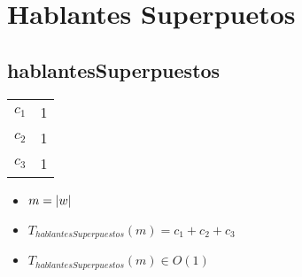 \documentclass{article}
\begin{document}
    \section*{Hablantes Superpuetos}

    \subsection*{hablantesSuperpuestos}

    \begin{minipage}{0.70\textwidth}
        
    \end{minipage}
    \hfill
    \begin{minipage}{0.25\textwidth}
        \begin{tabular}{|c|c}
            $c_1$ & 1 \\
            $c_2$ & 1 \\
            $c_3$ & 1 \\
        \end{tabular}
    \end{minipage}

    \begin{itemize}
        \item $m = |w|$
        \item $T_{hablantesSuperpuestos}(m) = c_1 + c_2 + c_3 $
        \item $T_{hablantesSuperpuestos}(m) \in O(1)$
    \end{itemize}
\end{document}
